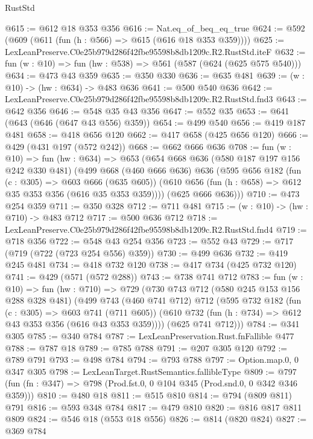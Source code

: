 \begin{lexlean}{RustStd}
\begin{coremodule}
@615 := @612 @18 @353 @356
@616 := Nat.eq_of_beq_eq_true
@624 := @592 (@609 (@611 (fun (h : @566) => @615 (@616 @18 @353 @359))))
@625 := LexLeanPreserve.C0e25b979d286f42fbe95598b8db1209c.R2.RustStd.iteF
@632 := fun (w : @10) => fun (hw : @538) => @561 (@587 (@624 (@625 @575 @540)))
@634 := @473 @43 @359
@635 := @350 @330
@636 := @635 @481
@639 := (w : @10) -> (hw : @634) -> @483 @636
@641 := @500 @540 @636
@642 := LexLeanPreserve.C0e25b979d286f42fbe95598b8db1209c.R2.RustStd.fnd3
@643 := @642 @356
@646 := @548 @35 @43 @356
@647 := @552 @35
@653 := @641 (@643 (@646 (@647 @43 @556) @359))
@654 := @499 @540
@656 := @419 @187 @481
@658 := @418 @656 @120
@662 := @417 @658 (@425 @656 @120)
@666 := @429 (@431 @197 (@572 @242))
@668 := @662 @666 @636
@708 := fun (w : @10) =>
  fun (hw : @634) =>
  @653
    (@654
      @668
      @636
      (@580 @187 @197 @156 @242 @330 @481)
      (@499
        @668
        (@460 @666 @636)
        @636
        (@595
          @656
          @182
          (fun (c : @305) => @603 @666 (@635 @605))
          (@610 @656 (fun (h : @658) => @612 @35 @353 @356 (@616 @35 @353 @359))))
        (@625 @666 @636)))
@710 := @473 @254 @359
@711 := @350 @328
@712 := @711 @481
@715 := (w : @10) -> (hw : @710) -> @483 @712
@717 := @500 @636 @712
@718 := LexLeanPreserve.C0e25b979d286f42fbe95598b8db1209c.R2.RustStd.fnd4
@719 := @718 @356
@722 := @548 @43 @254 @356
@723 := @552 @43
@729 := @717 (@719 (@722 (@723 @254 @556) @359))
@730 := @499 @636
@732 := @419 @245 @481
@734 := @418 @732 @120
@738 := @417 @734 (@425 @732 @120)
@741 := @429 (@571 (@572 @288))
@743 := @738 @741 @712
@783 := fun (w : @10) =>
  fun (hw : @710) =>
  @729
    (@730
      @743
      @712
      (@580 @245 @153 @156 @288 @328 @481)
      (@499
        @743
        (@460 @741 @712)
        @712
        (@595
          @732
          @182
          (fun (c : @305) => @603 @741 (@711 @605))
          (@610 @732 (fun (h : @734) => @612 @43 @353 @356 (@616 @43 @353 @359))))
        (@625 @741 @712)))
@784 := @341 @305
@785 := @340 @784
@787 := LexLeanPreservation.Rust.fnFallible @477
@788 := @787 @18
@789 := @785 @788
@791 := @207 @305 @120
@792 := @789 @791
@793 := @498 @784
@794 := @793 @788
@797 := Option.map.{0, 0} @347 @305
@798 := LexLeanTarget.RustSemantics.fallibleType
@809 := @797 (fun (fn : @347) => @798 (Prod.fst.{0, 0} @104 @345 (Prod.snd.{0, 0} @342 @346 @359)))
@810 := @480 @18
@811 := @515 @810
@814 := @794 (@809 @811) @791
@816 := @593 @348 @784
@817 := @479 @810
@820 := @816 @817 @811 @809
@824 := @546 @18 (@553 @18 @556)
@826 := @814 (@820 @824)
@827 := @369 @784

\end{coremodule}
\end{lexlean}
